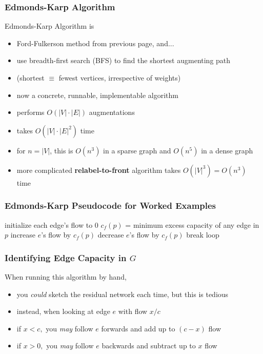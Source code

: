 \documentclass{beamer}
\begin{document}
\begin{frame} \frametitle{Edmonds-Karp Algorithm}
Edmonds-Karp Algorithm is
\begin{itemize}
  \item Ford-Fulkerson method from previous page, and...
  \item use breadth-first search (BFS) to find the shortest augmenting path
  \item (shortest $\equiv$ fewest vertices, irrespective of weights)
  \item now a concrete, runnable, implementable algorithm
  \item performs $O(|V| \cdot |E|)$ augmentations
  \item takes $O(|V| \cdot |E|^2)$ time
  \item for $n=|V|$, this is $O(n^3)$ in a sparse graph and $O(n^5)$ in a dense graph
  \item more complicated \textbf{relabel-to-front} algorithm takes $O(|V|^3)=O(n^3)$
    time
\end{itemize}
\end{frame}

\begin{frame} \frametitle{Edmonds-Karp Pseudocode for Worked Examples}
  {\footnotesize
  \begin{algorithmic}[1]
    \State initialize each edge's flow to 0
    \Repeat
          \State $c_f(p)$ = minimum excess capacity of any edge in $p$
              \State increase $e$'s flow by $c_f(p)$
            \Else
              \State decrease $e$'s flow by $c_f(p)$
            \EndIf
          \EndFor
          \State break loop
        \EndIf
      \EndFor
    \State {}
    \EndFunction
  \end{algorithmic}
  }
\end{frame}

\begin{frame} \frametitle{Identifying Edge Capacity in $G$}
When running this algorithm by hand,
\begin{itemize}
  \item you \emph{could} sketch the residual network each time, but this is tedious
  \item instead, when looking at edge $e$ with flow $x/c$
  \item if $x<c,$ you \emph{may} follow $e$ forwards and add up to $(c-x)$ flow
  \item if $x>0,$ you \emph{may} follow $e$ backwards and subtract up to $x$ flow
\end{itemize}
\end{frame}
\end{document}
